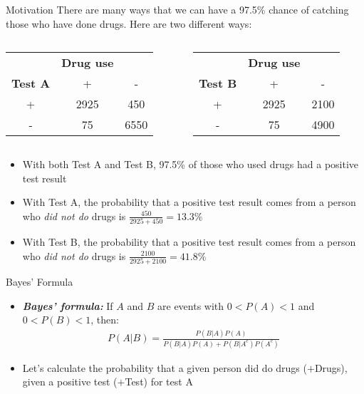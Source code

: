 \documentclass[xcolor=dvipsnames]{beamer}
\begin{document}
\begin{frame}{Motivation}
	There are many ways that we can have a 97.5\% chance of catching those who have done drugs. Here are two different ways: \pause
	\vspace{10 pt}
	\begin{columns}
		\begin{column}{0.5 \textwidth}
			\begin{tabular}{c|cc}
				& \textbf{Drug use} & \\
				\textbf{Test A} & + & - \\ \hline
				+ & 2925 & 450 \\
				- & 75 & 6550\\
			\end{tabular}
		\end{column} \pause
		\begin{column}{0.5 \textwidth}
			\begin{tabular}{c|cc}
				& \textbf{Drug use} & \\
				\textbf{Test B} & + & - \\ \hline
				+ & 2925 & 2100 \\
				- & 75 & 4900\\
			\end{tabular}
		\end{column}
	\end{columns}\pause
	\vspace{10 pt}
	\begin{itemize}
		\item With both Test A and Test B, 97.5\% of those who used drugs had a positive test result \pause
		\item With Test A, the probability that a positive test result comes from a person who  \emph{did not do} drugs is $\frac{450}{2925 + 450} = 13.3\%$ \pause
		\item With Test B, the probability that a positive test result comes from a person who \emph{did not do} drugs is $\frac{2100}{2925 + 2100}=41.8\%$
	\end{itemize}
\end{frame}

\begin{frame}{Bayes' Formula}
	\begin{itemize}
		\item \emph{\textbf{Bayes' formula:}} If $A$ and $B$ are events with $0 < P(A) < 1$ and $0 < P(B) < 1$, then: \pause
		\begin{gather*}
		P(A|B) = \frac{P(B|A) P(A)}{P(B|A) P(A) + P(B|A^c) P(A^c)}
		\end{gather*} \pause
		\item Let's calculate the probability that a given person did do drugs ($+$Drugs), given a positive test ($+$Test) for test A
	\end{itemize}
\end{frame}
\end{document}
